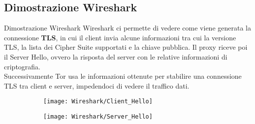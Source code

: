 \subsection{Dimostrazione Wireshark}
\begin{frame}{Dimostrazione Wireshark}
    Wireshark ci permette di vedere come viene generata la connessione \textbf{TLS}, in cui il client invia alcune informazioni tra cui la versione TLS, la lista dei Cipher Suite supportati e la chiave pubblica.
    Il proxy riceve poi il Server Hello, ovvero la risposta del server con le relative informazioni di criptografia. \\
    Successivamente Tor usa le informazioni ottenute per stabilire una connessione TLS tra client e server, impedendoci di vedere il traffico dati.
\end{frame}

\begin{frame}
    \begin{figure}[htbp]
        \begin{subfigure}[c]{0.5\textwidth}
            \texttt{[image: Wireshark/Client\_Hello]}
        \end{subfigure}
        \begin{subfigure}[c]{0.49\textwidth}
            \texttt{[image: Wireshark/Server\_Hello]}
        \end{subfigure}
    \end{figure}
\end{frame}

